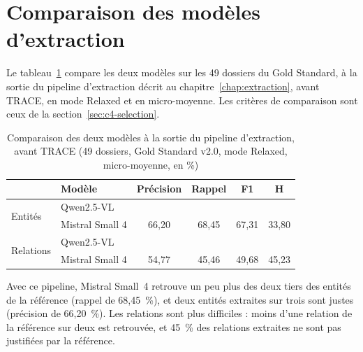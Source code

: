 
\section{Comparaison des modèles d'extraction}\label{sec:c6-modeles}

Le tableau~\ref{tab:c6-comparaison-modeles} compare les deux modèles sur les 49 dossiers du Gold Standard, à la sortie du pipeline d'extraction décrit au chapitre~\ref{chap:extraction}, avant TRACE, en mode Relaxed et en micro-moyenne. Les critères de comparaison sont ceux de la section~\ref{sec:c4-selection}.

\begin{table}[H]
\centering
\caption{Comparaison des deux modèles à la sortie du pipeline d'extraction, avant TRACE (49 dossiers, Gold Standard v2.0, mode Relaxed, micro-moyenne, en \%)}\label{tab:c6-comparaison-modeles}
\small
\begin{tabular}{llcccc}
\toprule
& \textbf{Modèle} & \textbf{Précision} & \textbf{Rappel} & \textbf{F1} & \textbf{H} \\
\midrule
\multirow{2}{*}{Entités} & Qwen2.5-VL & \acompleter{} & \acompleter{} & \acompleter{} & \acompleter{} \\
 & Mistral Small 4 & 66,20 & 68,45 & 67,31 & 33,80 \\
\midrule
\multirow{2}{*}{Relations} & Qwen2.5-VL & \acompleter{} & \acompleter{} & \acompleter{} & \acompleter{} \\
 & Mistral Small 4 & 54,77 & 45,46 & 49,68 & 45,23 \\
\bottomrule
\end{tabular}
\end{table}

Avec ce pipeline, Mistral Small~4 retrouve un peu plus des deux tiers des entités de la référence (rappel de 68,45~\%), et deux entités extraites sur trois sont justes (précision de 66,20~\%). Les relations sont plus difficiles : moins d'une relation de la référence sur deux est retrouvée, et 45~\% des relations extraites ne sont pas justifiées par la référence. 

